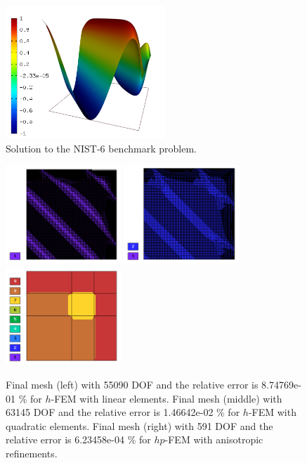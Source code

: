 \documentclass[12pt]{elsarticle}
\begin{document}
\begin{figure}[H]
\centering
\vspace{-3mm}
\includegraphics[height=5cm]{nist/nist-6/solution.png}
\caption{Solution to the NIST-6 benchmark problem.}
\vspace{-3mm}
\label{fig:sln-nist06}
\end{figure}

\begin{figure}[H]
\centering
\includegraphics[height=3.7cm]{nist/nist-6/mesh_h1_aniso.png}
\includegraphics[height=3.7cm]{nist/nist-6/mesh_h2_aniso.png}
\includegraphics[height=3.7cm]{nist/nist-6/mesh_hp_aniso.png}
\vspace{-3mm}
\caption{
Final mesh (left) with 55090 DOF and the relative error is 8.74769e-01 \% for $h$-FEM with linear elements.
Final mesh (middle) with 63145 DOF and the relative error is 1.46642e-02 \% for $h$-FEM with quadratic elements.
Final mesh (right) with 591 DOF and the relative error is 6.23458e-04 \% for $hp$-FEM with anisotropic refinements.}
\vspace{-2mm}
\label{fig:nist-6-hp-aniso}
\end{figure}
\end{document}

